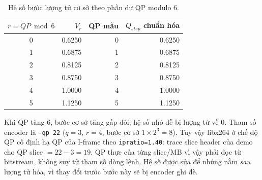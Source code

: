 \documentclass[11pt,a4paper]{article}
\renewcommand{\_}{\origunderscore\allowbreak}
\begin{document}
\begin{table}[H]\centering\small
\caption{Hệ số bước lượng tử cơ sở theo phần dư QP modulo 6.}
\begin{tabular}{crrr}\toprule
$r=QP\bmod6$ & $V_r$ & QP mẫu & $Q_{step}$ chuẩn hóa\\\midrule
0 & 0.6250 & 0 & 0.6250\\
1 & 0.6875 & 1 & 0.6875\\
2 & 0.8125 & 2 & 0.8125\\
3 & 0.8750 & 3 & 0.8750\\
4 & 1.0000 & 4 & 1.0000\\
5 & 1.1250 & 5 & 1.1250\\
\bottomrule\end{tabular}
\end{table}
Khi QP tăng 6, bước cơ sở tăng gấp đôi; hệ số nhỏ dễ bị lượng tử về 0. Tham số encoder là \texttt{-qp 22} ($q=3$, $r=4$, bước cơ sở $1\times2^3=8$). Tuy vậy libx264 ở chế độ QP cố định hạ QP của I-frame theo \texttt{ip\_ratio=1.40}: trace slice header của demo cho QP slice $=22-3=19$. QP thực của từng slice/MB vì vậy phải đọc từ bitstream, không suy từ tham số dòng lệnh. Hệ số được sửa để nhúng nằm \emph{sau} lượng tử hóa, vì thay đổi trước bước này sẽ bị encoder ghi đè.
\end{document}

